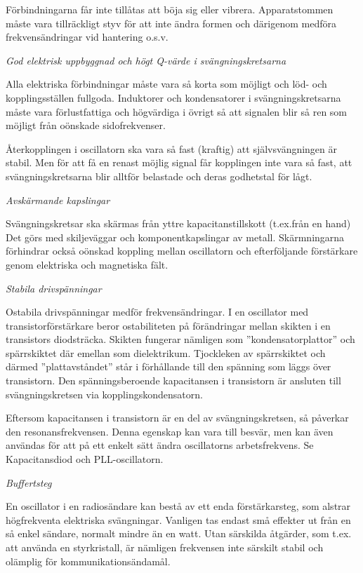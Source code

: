 Förbindningarna får inte tillåtas att böja sig eller
vibrera. Apparatstommen måste vara tillräckligt styv för att inte
ändra formen och därigenom medföra frekvensändringar vid hantering
o.s.v.

\emph{God elektrisk uppbyggnad och högt Q-värde i svängningskretsarna}

Alla elektriska förbindningar måste vara så korta som möjligt och löd-
och kopplingsställen fullgoda. Induktorer och kondensatorer i
svängningskretsarna måste vara förlustfattiga och högvärdiga i övrigt
så att signalen blir så ren som möjligt från oönskade sidofrekvenser.

Återkopplingen i oscillatorn ska vara så fast (kraftig) att
självsvängningen är stabil.  Men för att få en renast möjlig signal
får kopplingen inte vara så fast, att svängningskretsarna blir alltför
belastade och deras godhetstal för lågt.

\emph{Avskärmande kapslingar}

Svängningskretsar ska skärmas från yttre kapacitanstillskott
(t.ex.från en hand) Det görs med skiljeväggar och komponentkapslingar
av metall. Skärmningarna förhindrar också oönskad koppling mellan
oscillatorn och efterföljande förstärkare genom elektriska och
magnetiska fält.

\emph{Stabila drivspänningar}

Ostabila drivspänningar medför frekvensändringar. I en oscillator med
transistorförstärkare beror ostabiliteten på förändringar mellan
skikten i en transistors diodsträcka.  Skikten fungerar nämligen som
''kondensatorplattor'' och spärrskiktet där emellan som
dielektrikum. Tjockleken av spärrskiktet och därmed ''plattavståndet''
står i förhållande till den spänning som läggs över transistorn.  Den
spänningsberoende kapacitansen i transistorn är ansluten till
svängningskretsen via kopplingskondensatorn.

Eftersom kapacitansen i transistorn är en del av svängningskretsen, så
påverkar den resonansfrekvensen. Denna egenskap kan vara till besvär,
men kan även användas för att på ett enkelt sätt ändra oscillatorns
arbetsfrekvens.  Se Kapacitansdiod och PLL-oscillatorn.

\emph{Buffertsteg}

En oscillator i en radiosändare kan bestå av ett enda förstärkarsteg,
som alstrar högfrekventa elektriska svängningar. Vanligen tas endast
små effekter ut från en så enkel sändare, normalt mindre än en
watt. Utan särskilda åtgärder, som t.ex. att använda en styrkristall,
är nämligen frekvensen inte särskilt stabil och olämplig för
kommunikationsändamål.

